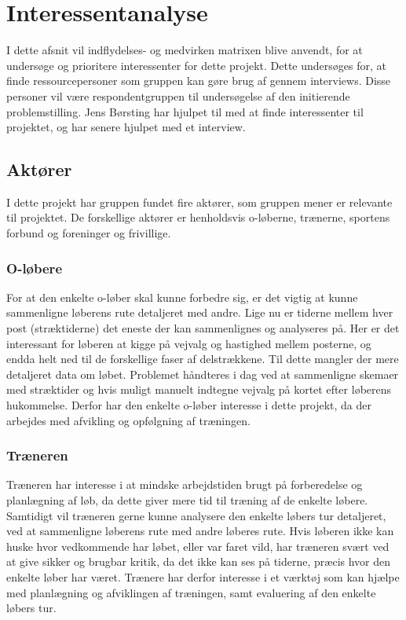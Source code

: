 \section{Interessentanalyse}
I dette afsnit vil indflydelses- og medvirken matrixen blive anvendt, for at undersøge og prioritere interessenter for dette projekt. Dette undersøges for, at finde ressourcepersoner som gruppen kan gøre brug af gennem interviews. Disse personer vil være respondentgruppen til undersøgelse af den initierende problemstilling.
Jens Børsting har hjulpet til med at finde interessenter til projektet, og har senere hjulpet med et interview.

\subsection{Aktører}
I dette projekt har gruppen fundet fire aktører, som gruppen mener er relevante til projektet. De forskellige aktører er henholdsvis o-løberne, trænerne, sportens forbund og foreninger og frivillige. 

\subsubsection{O-løbere}
For at den enkelte o-løber skal kunne forbedre sig, er det vigtig at kunne sammenligne løberens rute detaljeret med andre. Lige nu er tiderne mellem hver post (stræktiderne) det eneste der kan sammenlignes og analyseres på. Her er det interessant for løberen at kigge på vejvalg og hastighed mellem posterne, og endda helt ned til de forskellige faser af delstrækkene. Til dette mangler der mere detaljeret data om løbet. Problemet håndteres i dag ved at sammenligne skemaer med stræktider og hvis muligt manuelt indtegne vejvalg på kortet efter løberens hukommelse. Derfor har den enkelte o-løber interesse i dette projekt, da der arbejdes med afvikling og opfølgning af træningen. 

\subsubsection{Træneren}
Træneren har interesse i at mindske arbejdstiden brugt på forberedelse og planlægning af løb, da dette giver mere tid til træning af de enkelte løbere. Samtidigt vil træneren gerne kunne analysere den enkelte løbers tur detaljeret, ved at sammenligne løberens rute med andre løberes rute. Hvis løberen ikke kan huske hvor vedkommende har løbet, eller var faret vild, har træneren svært ved at give sikker og brugbar kritik, da det ikke kan ses på tiderne, præcis hvor den enkelte løber har været. Trænere har derfor interesse i et værktøj som kan hjælpe med planlægning og afviklingen af træningen, samt evaluering af den enkelte løbers tur.

